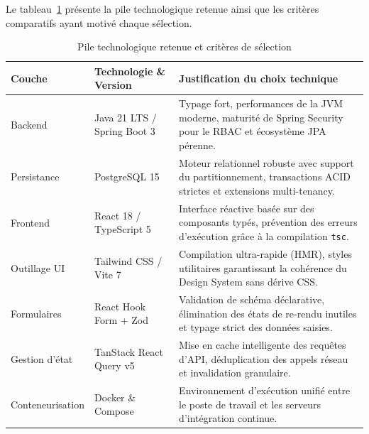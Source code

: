 Le tableau~\ref{tab:choix-technologiques} présente la pile technologique retenue ainsi que les critères comparatifs ayant motivé chaque sélection.

\begin{table}[h]
\centering
\small
\begin{tabular}{llp{7cm}}
\toprule
\textbf{Couche} & \textbf{Technologie \& Version} & \textbf{Justification du choix technique} \\
\midrule
Backend & Java 21 LTS / Spring Boot 3 & Typage fort, performances de la JVM moderne, maturité de Spring Security pour le RBAC et écosystème JPA pérenne. \\
Persistance & PostgreSQL 15 & Moteur relationnel robuste avec support du partitionnement, transactions ACID strictes et extensions multi-tenancy. \\
Frontend & React 18 / TypeScript 5 & Interface réactive basée sur des composants typés, prévention des erreurs d'exécution grâce à la compilation \texttt{tsc}. \\
Outillage UI & Tailwind CSS / Vite 7 & Compilation ultra-rapide (HMR), styles utilitaires garantissant la cohérence du Design System sans dérive CSS. \\
Formulaires & React Hook Form + Zod & Validation de schéma déclarative, élimination des états de re-rendu inutiles et typage strict des données saisies. \\
Gestion d'état & TanStack React Query v5 & Mise en cache intelligente des requêtes d'API, déduplication des appels réseau et invalidation granulaire. \\
Conteneurisation & Docker \& Compose & Environnement d'exécution unifié entre le poste de travail et les serveurs d'intégration continue. \\
\bottomrule
\end{tabular}
\caption{Pile technologique retenue et critères de sélection}
\label{tab:choix-technologiques}
\end{table}
